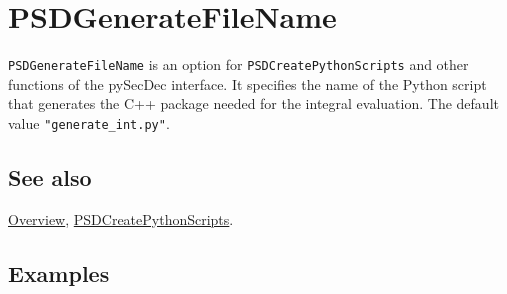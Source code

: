 \documentclass[../FeynHelpersManual.tex]{subfiles}
\begin{document}
\hypertarget{psdgeneratefilename}{
\section{PSDGenerateFileName}\label{psdgeneratefilename}}

\texttt{PSDGenerateFileName} is an option for
\texttt{PSDCreatePythonScripts} and other functions of the pySecDec
interface. It specifies the name of the Python script that generates the
C++ package needed for the integral evaluation. The default value
\texttt{"generate_int.py"}.

\subsection{See also}

\hyperlink{toc}{Overview},
\hyperlink{psdcreatepythonscripts}{PSDCreatePythonScripts}.

\subsection{Examples}
\end{document}
